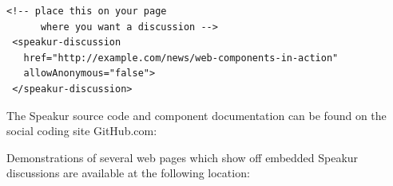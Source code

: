 \begin{lstlisting}[language=HTML5,numbers=none,caption=
{Example of the Speakur custom HTML element},label=example1,captionpos=below]
 <!-- place this on your page
      where you want a discussion -->
 <speakur-discussion
   href="http://example.com/news/web-components-in-action"
   allowAnonymous="false">
 </speakur-discussion>
\end{lstlisting}



The Speakur source code and component documentation can be found on the social coding site GitHub.com:


Demonstrations of several web pages which show off embedded Speakur discussions are available at the following location:


